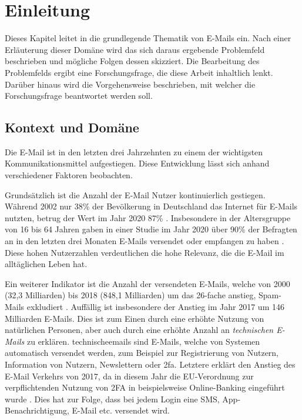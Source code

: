 
\chapter{Einleitung}
\label{Einleitung}

Dieses Kapitel leitet in die grundlegende Thematik von E-Mails ein. Nach einer Erläuterung dieser Domäne wird das sich daraus ergebende Problemfeld beschrieben und mögliche Folgen dessen skizziert. Die Bearbeitung des Problemfelds ergibt eine Forschungsfrage, die diese Arbeit inhaltlich lenkt. Darüber hinaus wird die Vorgehensweise beschrieben, mit welcher die Forschungsfrage beantwortet werden soll.

\section{Kontext und Domäne}
\label{Kontext_und_Domaene}
Die E-Mail ist in den letzten drei Jahrzehnten zu einem der wichtigsten Kommunikationsmittel aufgestiegen. Diese Entwicklung lässt sich anhand verschiedener Faktoren beobachten.

Grundsätzlich ist die Anzahl der E-Mail Nutzer kontinuierlich gestiegen. Während 2002 nur 38\% der Bevölkerung in Deutschland das Internet für E-Mails nutzten, betrug der Wert im Jahr 2020 87\% \citep{SAEU2022}. Insbesondere in der Altersgruppe von 16 bis 64 Jahren gaben in einer Studie im Jahr 2020 über 90\% der Befragten an in den letzten drei Monaten E-Mails versendet oder empfangen zu haben \citep{StatistischesBundesamt2021}. Diese hohen Nutzerzahlen verdeutlichen die hohe Relevanz, die die E-Mail im alltäglichen Leben hat.

Ein weiterer Indikator ist die Anzahl der versendeten E-Mails, welche von 2000 (32,3 Milliarden) bis 2018 (848,1 Milliarden) um das 26-fache anstieg, Spam-Mails exkludiert \citep{MMG2018}. Auffällig ist insbesondere der Anstieg im Jahr 2017 um 146 Milliarden E-Mails. Dies ist zum Einen durch eine erhöhte Nutzung von natürlichen Personen, aber auch durch eine erhöhte Anzahl an \textit{technischen E-Mails} zu erklären.  \gls{technischeemail}s sind E-Mails, welche von Systemen automatisch versendet werden, zum Beispiel zur Registrierung von Nutzern, Information von Nutzern, Newslettern oder \acrfull{2fa}. Letztere erklärt den Anstieg des E-Mail Verkehrs von 2017, da in diesem Jahr die EU-Verordnung zur verpflichtenden Nutzung von 2FA in beispielsweise Online-Banking eingeführt wurde \citep{EuropaeischeKommission2017}. Dies hat zur Folge, dass bei jedem Login eine SMS, App-Benachrichtigung, E-Mail etc. versendet wird.

